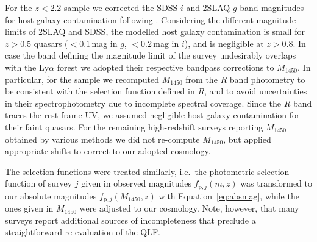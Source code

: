 \documentclass[fleqn,usenatbib]{mnras}
\begin{document}
For the $z<2.2$ sample we corrected the SDSS $i$ and 2SLAQ $g$ band
magnitudes for host galaxy contamination following
\citet{2009MNRAS.392...19C}. Considering the different magnitude
limits of 2SLAQ and SDSS, the modelled host galaxy contamination is
small for $z>0.5$ quasars ($<0.1$\,mag in $g$, $<0.2$\,mag in $i$),
and is negligible at $z>0.8$.  In case the band defining the magnitude
limit of the survey undesirably overlaps with the Ly$\alpha$ forest
\citep{2010ApJ...710.1498G, 2011ApJ...728L..26G, 2013ApJ...768..105M}
we adopted their respective bandpass corrections to $M_{1450}$. In
particular, for the \citet{2010ApJ...710.1498G, 2011ApJ...728L..26G}
sample we recomputed $M_{1450}$ from the $R$ band photometry to be
consistent with the selection function defined in $R$, and to avoid
uncertainties in their spectrophotometry due to incomplete spectral
coverage. Since the \citet{2010ApJ...710.1498G, 2011ApJ...728L..26G}
$R$ band traces the rest frame UV, we assumed negligible host galaxy
contamination for their faint quasars. For the remaining high-redshift
surveys reporting $M_{1450}$ obtained by various methods
\citep{2010AJ....139..906W, 2015ApJ...798...28K, 2015AA...578A..83G,
  2016ApJ...829...33Y, 2016ApJ...833..222J} we did not re-compute
$M_{1450}$, but applied appropriate shifts to correct to our adopted
cosmology.

The selection functions were treated similarly, i.e.\ the photometric
selection function of survey $j$ given in observed magnitudes
$f_{\mathrm{p},j}\left(m,z\right)$ \citep{2006AJ....131.2766R,
  2009MNRAS.392...19C, 2010ApJ...710.1498G, 2013ApJ...773...14R} was
transformed to our absolute magnitudes
$f_{\mathrm{p},j}\left(M_{1450},z\right)$ with
Equation~\ref{eq:absmag}, while the ones given in $M_{1450}$ were
adjusted to our cosmology. Note, however, that many surveys report
additional sources of incompleteness that preclude a straightforward
re-evaluation of the QLF.
\end{document}
